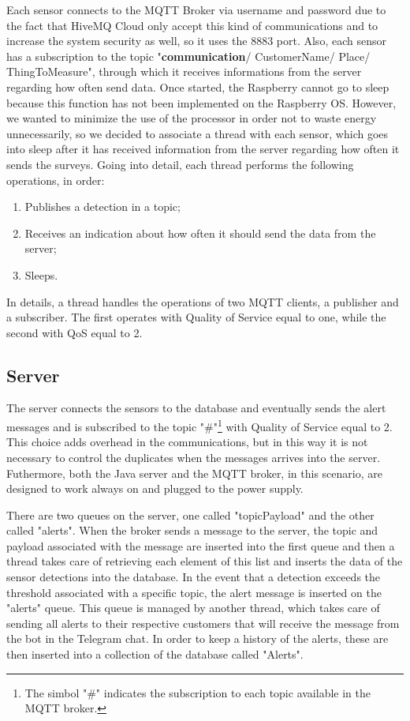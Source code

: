 Each sensor connects to the MQTT Broker via username and password due to the fact that HiveMQ Cloud only accept this kind of communications and to increase the system security as well, so it uses the 8883 port. Also, each sensor has a subscription to the topic "\textbf{communication}/ CustomerName/ Place/ ThingToMeasure", through which it receives informations from the server regarding how often send data. Once started, the Raspberry cannot go to sleep because this function has not been implemented on the Raspberry OS. However, we wanted to minimize the use of the processor in order not to waste energy unnecessarily, so we decided to associate a thread with each sensor, which goes into sleep after it has received information from the server regarding how often it sends the surveys. Going into detail, each thread performs the following operations, in order:
\begin{enumerate}
    \item Publishes a detection in a topic;
    \item Receives an indication about how often it should send the data from the server;
    \item Sleeps.
\end{enumerate}

In details, a thread handles the operations of two MQTT clients, a publisher and a subscriber. The first operates with Quality of Service equal to one, while the second with QoS equal to 2.

\subsection{Server}
The server connects the sensors to the database and eventually sends the alert messages and is subscribed to the topic "\#"\footnote{The simbol "\#" indicates the subscription to each topic available in the MQTT broker.} with Quality of Service equal to 2. This choice adds overhead in the communications, but in this way it is not necessary to control the duplicates when the messages arrives into the server. Futhermore, both the Java server and the MQTT broker, in this scenario, are designed to work always on and plugged to the power supply.
\vspace{3mm}

There are two queues on the server, one called "topicPayload" and the other called "alerts". When the broker sends a message to the server, the topic and payload associated with the message are inserted into the first queue and then a thread takes care of retrieving each element of this list and inserts the data of the sensor detections into the database. In the event that a detection exceeds the threshold associated with a specific topic, the alert message is inserted on the "alerts" queue. This queue is managed by another thread, which takes care of sending all alerts to their respective customers that will receive the message from the bot in the Telegram chat. In order to keep a history of the alerts, these are then inserted into a collection of the database called "Alerts".
\vspace{3mm}

